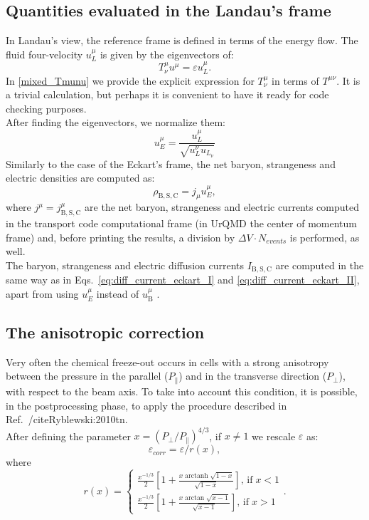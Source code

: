 \documentclass[12pt, a4paper]{article}
\DeclareMathOperator\arctanh{arctanh}
\begin{document}
\subsection{Quantities evaluated in the Landau's frame}
In Landau's view, the reference frame is defined in terms of the energy flow. The fluid four-velocity $u^{\mu}_L$ is given by the eigenvectors of:
\begin{equation}
T^{\mu}_{\nu}u^{\mu}=\varepsilon u^{\mu}_L.
\label{eq:landau_four_vel_def}
\end{equation}
In \ref{mixed_Tmunu} we provide the explicit expression for $T^{\mu}_{\nu}$ in terms of $T^{\mu\nu}$. It is a trivial calculation, but perhaps it is convenient to have it ready for code checking purposes.\\
After finding the eigenvectors, we normalize them:
\begin{equation}
u^{\mu}_E=\dfrac{u^{\mu}_L}{\sqrt{u^{\nu}_L u_{{L}_\nu}}}
\label{eq:landau_four_vel}
\end{equation}
Similarly to the case of the Eckart's frame, the net baryon, strangeness and electric densities are computed as:
\begin{equation}
\rho_{\mathrm{B,S,C}}=j_{\mu}u^{\mu}_E,
\label{eq:densities_Landau}
\end{equation}
where $j^{\mu}=j^{\mu}_{\mathrm{B,S,C}}$ are the net baryon, strangeness and electric currents computed in the transport code computational frame (in UrQMD the center of momentum frame) and, before printing the results, a division by $\Delta V \cdot N_{events}$ is performed, as well.\\
The baryon, strangeness and electric diffusion currents $I_{\mathrm{B,S,C}}$ are computed in the same way as in Eqs.~\ref{eq:diff_current_eckart_I} and \ref{eq:diff_current_eckart_II}, apart from using $u^{\mu}_E$ instead of $u^{\mu}_\mathrm{B}$ .

\subsection{The anisotropic correction}
Very often the chemical freeze-out occurs in cells with a strong anisotropy between the pressure in the parallel ($P_{\parallel}$) and in the transverse direction ($P_{\perp}$), with respect to the beam axis. To take into account this condition, it is possible, in the postprocessing phase, to apply the procedure described in Ref.~/cite{Ryblewski:2010tn}.\\
After defining the parameter $x=(P_{\perp}/P_{\parallel})^{4/3}$, if $x\neq1$ we rescale $\varepsilon$ as:
\begin{equation}
\varepsilon_{corr}=\varepsilon/r(x),
\label{eq:energy_dens_rescaling}
\end{equation}
where 
\begin{equation}
r(x) =
\left\{
\begin{aligned}
\frac{x^{-1/3}}{2} \left[1+\frac{x \arctanh \sqrt{1-x}}{\sqrt{1-x}}\right],\, \mathrm{if}\; x < 1\\
\frac{x^{-1/3}}{2} \left[1+\frac{x \arctan \sqrt{x-1}}{\sqrt{x-1}}\right], \, \mathrm{if}\; x > 1
\end{aligned}
\right.
.
\label{eq:r_correction}
\end{equation}
\end{document}
